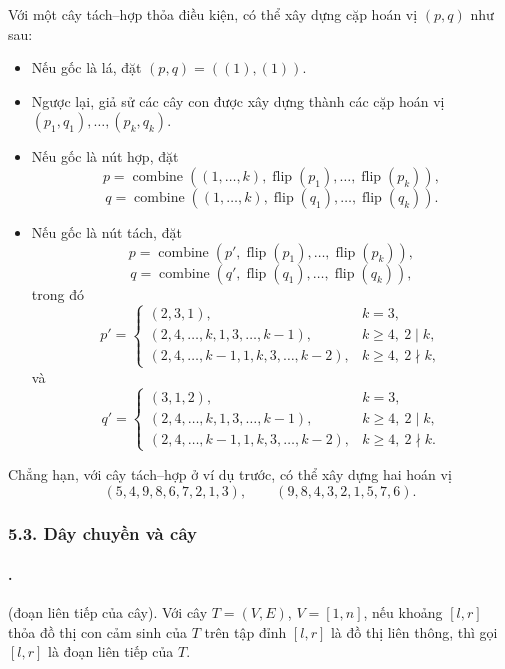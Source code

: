 \documentclass[11pt]{article}
\begin{document}
Với một cây tách--hợp thỏa điều kiện, có thể xây dựng cặp hoán vị $(p,q)$ như
sau:
\begin{itemize}
  \item Nếu gốc là lá, đặt $(p,q)=((1),(1))$.
  \item Ngược lại, giả sử các cây con được xây dựng thành các cặp hoán vị
  $(p_1,q_1),\ldots,(p_k,q_k)$.
  \item Nếu gốc là nút hợp, đặt
  \[
    p=\operatorname{combine}((1,\ldots,k),
    \operatorname{flip}(p_1),\ldots,\operatorname{flip}(p_k)),
  \]
  \[
    q=\operatorname{combine}((1,\ldots,k),
    \operatorname{flip}(q_1),\ldots,\operatorname{flip}(q_k)).
  \]
  \item Nếu gốc là nút tách, đặt
  \[
    p=\operatorname{combine}(p',
    \operatorname{flip}(p_1),\ldots,\operatorname{flip}(p_k)),
  \]
  \[
    q=\operatorname{combine}(q',
    \operatorname{flip}(q_1),\ldots,\operatorname{flip}(q_k)),
  \]
  trong đó
  \[
    p'=
    \begin{cases}
      (2,3,1), & k=3,\\
      (2,4,\ldots,k,1,3,\ldots,k-1), & k\ge4,\ 2\mid k,\\
      (2,4,\ldots,k-1,1,k,3,\ldots,k-2), & k\ge4,\ 2\nmid k,
    \end{cases}
  \]
  và
  \[
    q'=
    \begin{cases}
      (3,1,2), & k=3,\\
      (2,4,\ldots,k,1,3,\ldots,k-1), & k\ge4,\ 2\mid k,\\
      (2,4,\ldots,k-1,1,k,3,\ldots,k-2), & k\ge4,\ 2\nmid k.
    \end{cases}
  \]
\end{itemize}

Chẳng hạn, với cây tách--hợp ở ví dụ trước, có thể xây dựng hai hoán vị
\[
  (5,4,9,8,6,7,2,1,3),\qquad (9,8,4,3,2,1,5,7,6).
\]

\subsubsection*{5.3. Dây chuyền và cây}

\paragraph{.}
 (đoạn liên tiếp của cây). Với cây $T=(V,E)$,
$V=[1,n]$, nếu khoảng $[l,r]$ thỏa đồ thị con cảm sinh của $T$ trên tập đỉnh
$[l,r]$ là đồ thị liên thông, thì gọi $[l,r]$ là đoạn liên tiếp của $T$.
\end{document}
